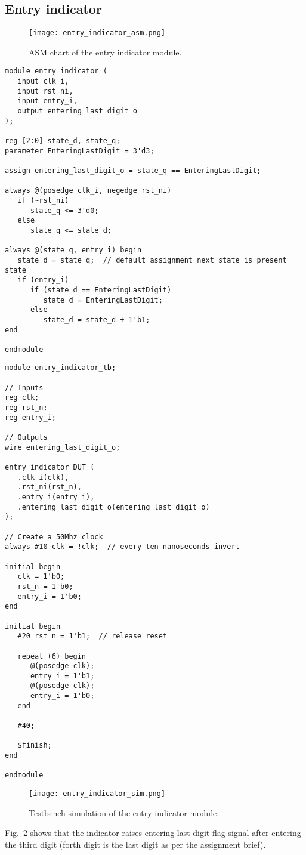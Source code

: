 \subsection{Entry indicator}

\begin{figure}[htbp]
   \centering
   \texttt{[image: entry\_indicator\_asm.png]}
   \caption{ASM chart of the entry indicator module.}
   \label{fig:entry_indicator_asm}
\end{figure}

\begin{verbatim}
module entry_indicator (
   input clk_i,
   input rst_ni,
   input entry_i,
   output entering_last_digit_o
);

reg [2:0] state_d, state_q;
parameter EnteringLastDigit = 3'd3;

assign entering_last_digit_o = state_q == EnteringLastDigit;

always @(posedge clk_i, negedge rst_ni)
   if (~rst_ni)
      state_q <= 3'd0;
   else
      state_q <= state_d;

always @(state_q, entry_i) begin
   state_d = state_q;  // default assignment next state is present state
   if (entry_i)
      if (state_d == EnteringLastDigit)
         state_d = EnteringLastDigit;
      else
         state_d = state_d + 1'b1;
end

endmodule
\end{verbatim}

\begin{verbatim}
module entry_indicator_tb;

// Inputs
reg clk;
reg rst_n;
reg entry_i;

// Outputs
wire entering_last_digit_o;

entry_indicator DUT (
   .clk_i(clk),
   .rst_ni(rst_n),
   .entry_i(entry_i),
   .entering_last_digit_o(entering_last_digit_o)
);

// Create a 50Mhz clock
always #10 clk = !clk;  // every ten nanoseconds invert

initial begin
   clk = 1'b0;
   rst_n = 1'b0;
   entry_i = 1'b0;
end

initial begin
   #20 rst_n = 1'b1;  // release reset

   repeat (6) begin
      @(posedge clk);
      entry_i = 1'b1;
      @(posedge clk);
      entry_i = 1'b0;
   end

   #40;

   $finish;
end

endmodule
\end{verbatim}

\begin{figure}[htbp]
   \centerline{
   \texttt{[image: entry\_indicator\_sim.png]}}
   \caption{Testbench simulation of the entry indicator module.}
   \label{fig:entry_indicator_sim}
\end{figure}

Fig.~\ref{fig:entry_indicator_sim} shows that the indicator raises entering-last-digit flag signal after entering the third digit (forth digit is the last digit as per the assignment brief).
